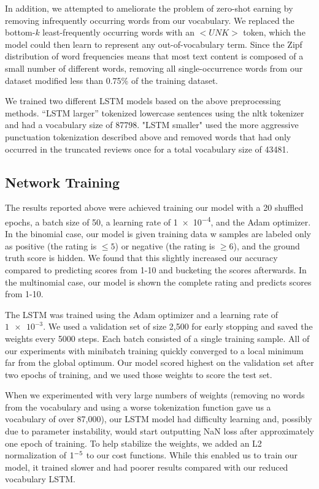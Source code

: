 \documentclass[conference]{IEEEtran}
\begin{document}
    In addition, we attempted to ameliorate the problem of zero-shot earning by removing 
    infrequently occurring words from our vocabulary. We replaced the bottom-$k$ 
    least-frequently occurring words with an $<UNK>$ token, which the model could then
    learn to represent any out-of-vocabulary term. Since the Zipf distribution of word frequencies
    means that most text content is composed of a small number of different words, removing all
    single-occurrence words from our dataset modified less than 0.75\% of the training dataset.
     
    We trained two different LSTM models based on the above preprocessing methods.
    ``LSTM larger'' tokenized lowercase sentences using the nltk tokenizer and had a
    vocabulary size of 87798. "LSTM smaller" used the more aggressive punctuation tokenization
    described above and removed words that had only occurred in the truncated reviews once
    for a total vocabulary size of 43481.

   
\subsection{Network Training}
The results reported
    above were achieved training our model with a 20 shuffled epochs, a
    batch size of 50, a learning rate of \num{1e-4}, and the Adam optimizer.
    In the binomial case, our model is given training data w samples are
    labeled only as positive (the rating is $\leq 5$) or negative (the rating is
    $\geq 6$), and the ground truth score is hidden. We found that this slightly
    increased our accuracy compared to predicting scores from 1-10 and
    bucketing the scores afterwards. In the multinomial case, our model is
    shown the complete rating and predicts scores from 1-10.



    The LSTM was trained using the Adam optimizer and a learning rate of $\num{1e-3}$. We used a
    validation set of size 2,500 for early stopping and saved the weights every 5000 steps. Each
    batch consisted of a single training sample. All of our experiments with minibatch training 
    quickly converged to a local minimum far from the global optimum. Our model scored highest 
    on the validation set after two epochs of training, and we used those weights to score the test set.
    
    When we experimented with very large numbers of weights (removing no words from the 
    vocabulary and using a worse tokenization function gave us a vocabulary of over 87,000),
    our LSTM model had difficulty learning and, possibly due to parameter instability, would start
    outputting NaN loss after approximately one epoch of training. To help stabilize the weights,
    we added an L2 normalization of $1\time10^{-5}$ to our cost functions. While this enabled us
    to train our model, it trained slower and had poorer results compared with our reduced vocabulary 
    LSTM.
\end{document}
